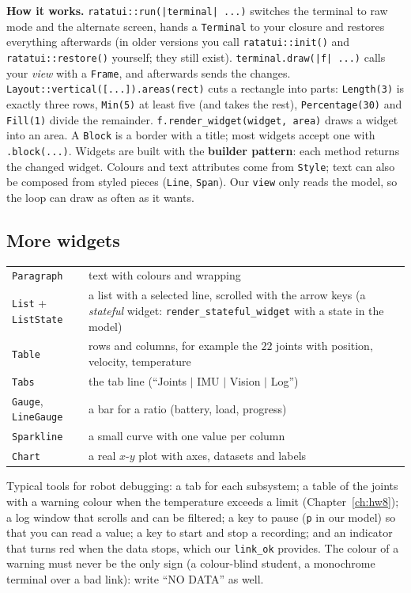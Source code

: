 \textbf{How it works.} \verb!ratatui::run(|terminal| ...)! switches the terminal to raw mode and the alternate screen, hands a \verb!Terminal! to your closure and restores everything afterwards (in older versions you call \verb!ratatui::init()! and \verb!ratatui::restore()! yourself; they still exist). \verb!terminal.draw(|f| ...)! calls your \emph{view} with a \verb!Frame!, and afterwards sends the changes. \verb!Layout::vertical([...]).areas(rect)! cuts a rectangle into parts: \verb!Length(3)! is exactly three rows, \verb!Min(5)! at least five (and takes the rest), \verb!Percentage(30)! and \verb!Fill(1)! divide the remainder. \verb!f.render_widget(widget, area)! draws a widget into an area. A \verb!Block! is a border with a title; most widgets accept one with \verb!.block(...)!. Widgets are built with the \textbf{builder pattern}: each method returns the changed widget. Colours and text attributes come from \verb!Style!; text can also be composed from styled pieces (\verb!Line!, \verb!Span!). Our \verb!view! only reads the model, so the loop can draw as often as it wants.

\subsection*{More widgets}
\begin{center}
\renewcommand{\arraystretch}{1.2}
\begin{tabular}{lp{9cm}}
\verb!Paragraph! & text with colours and wrapping\\
\verb!List! + \verb!ListState! & a list with a selected line, scrolled with the arrow keys (a \emph{stateful} widget: \verb!render_stateful_widget! with a state in the model)\\
\verb!Table! & rows and columns, for example the $22$ joints with position, velocity, temperature\\
\verb!Tabs! & the tab line (``Joints $|$ IMU $|$ Vision $|$ Log'')\\
\verb!Gauge!, \verb!LineGauge! & a bar for a ratio (battery, load, progress)\\
\verb!Sparkline! & a small curve with one value per column\\
\verb!Chart! & a real $x$-$y$ plot with axes, datasets and labels\\
\end{tabular}
\end{center}
Typical tools for robot debugging: a tab for each subsystem; a table of the joints with a warning colour when the temperature exceeds a limit (Chapter~\ref{ch:hw8}); a log window that scrolls and can be filtered; a key to pause (\verb!p! in our model) so that you can read a value; a key to start and stop a recording; and an indicator that turns red when the data stops, which our \verb!link_ok! provides. The colour of a warning must never be the only sign (a colour-blind student, a monochrome terminal over a bad link): write ``NO DATA'' as well.

